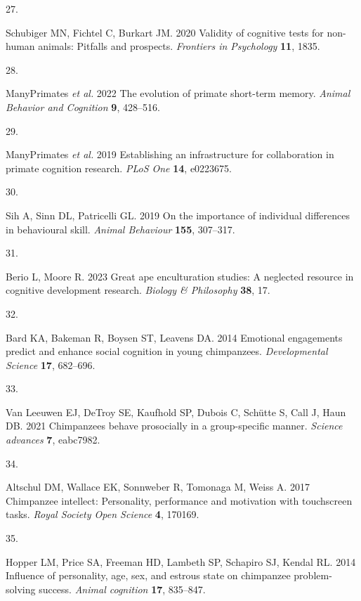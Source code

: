 \documentclass[
  man,floatsintext]{apa6}
\newlength{\cslhangindent}
\newlength{\csllabelwidth}
\newenvironment{CSLReferences}[2] %
 {\begin{list}{}{%
  \setlength{\itemindent}{0pt}
  \setlength{\leftmargin}{0pt}
  \setlength{\parsep}{0pt}
  \ifodd #1
   \setlength{\leftmargin}{\cslhangindent}
   \setlength{\itemindent}{-1\cslhangindent}
  \fi
  \setlength{\itemsep}{#2\baselineskip}}}
 {\end{list}}
\newcommand{\CSLLeftMargin}[1]{\parbox[t]{\csllabelwidth}{\strut#1\strut}}
\newcommand{\CSLRightInline}[1]{\parbox[t]{\linewidth - \csllabelwidth}{\strut#1\strut}}
\begin{document}
\begin{CSLReferences}{0}{1}
\CSLLeftMargin{27. }%
\CSLRightInline{Schubiger MN, Fichtel C, Burkart JM. 2020 Validity of cognitive tests for non-human animals: Pitfalls and prospects. \emph{Frontiers in Psychology} \textbf{11}, 1835.}

\CSLLeftMargin{28. }%
\CSLRightInline{ManyPrimates \emph{et al.} 2022 The evolution of primate short-term memory. \emph{Animal Behavior and Cognition} \textbf{9}, 428--516.}

\CSLLeftMargin{29. }%
\CSLRightInline{ManyPrimates \emph{et al.} 2019 Establishing an infrastructure for collaboration in primate cognition research. \emph{PLoS One} \textbf{14}, e0223675.}

\CSLLeftMargin{30. }%
\CSLRightInline{Sih A, Sinn DL, Patricelli GL. 2019 On the importance of individual differences in behavioural skill. \emph{Animal Behaviour} \textbf{155}, 307--317.}

\CSLLeftMargin{31. }%
\CSLRightInline{Berio L, Moore R. 2023 Great ape enculturation studies: A neglected resource in cognitive development research. \emph{Biology \& Philosophy} \textbf{38}, 17.}

\CSLLeftMargin{32. }%
\CSLRightInline{Bard KA, Bakeman R, Boysen ST, Leavens DA. 2014 Emotional engagements predict and enhance social cognition in young chimpanzees. \emph{Developmental Science} \textbf{17}, 682--696.}

\CSLLeftMargin{33. }%
\CSLRightInline{Van Leeuwen EJ, DeTroy SE, Kaufhold SP, Dubois C, Schütte S, Call J, Haun DB. 2021 Chimpanzees behave prosocially in a group-specific manner. \emph{Science advances} \textbf{7}, eabc7982.}

\CSLLeftMargin{34. }%
\CSLRightInline{Altschul DM, Wallace EK, Sonnweber R, Tomonaga M, Weiss A. 2017 Chimpanzee intellect: Personality, performance and motivation with touchscreen tasks. \emph{Royal Society Open Science} \textbf{4}, 170169.}

\CSLLeftMargin{35. }%
\CSLRightInline{Hopper LM, Price SA, Freeman HD, Lambeth SP, Schapiro SJ, Kendal RL. 2014 Influence of personality, age, sex, and estrous state on chimpanzee problem-solving success. \emph{Animal cognition} \textbf{17}, 835--847.}


\end{CSLReferences}
\end{document}

